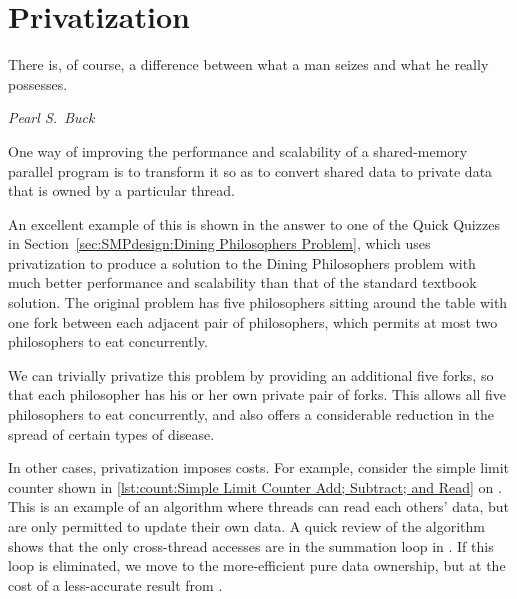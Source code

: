\section{Privatization}
\label{sec:owned:Privatization}
%
\epigraph{There is, of course, a difference between what a man seizes
	  and what he really possesses.}
	 {\emph{Pearl S.~Buck}}

One way of improving the performance and scalability of a shared-memory
parallel program is to transform it so as to convert shared data to
private data that is owned by a particular thread.

An excellent example of this is shown in the answer to one of the
Quick Quizzes in
Section~\ref{sec:SMPdesign:Dining Philosophers Problem},
which uses privatization to produce a solution to the
Dining Philosophers problem with much better performance and scalability
than that of the standard textbook solution.
The original problem has five philosophers sitting around the table
with one fork between each adjacent pair of philosophers, which permits
at most two philosophers to eat concurrently.

We can trivially privatize this problem by providing an additional five
forks, so that each philosopher has his or her own private pair of forks.
This allows all five philosophers to eat concurrently, and also offers
a considerable reduction in the spread of certain types of disease.

In other cases, privatization imposes costs.
For example, consider the simple limit counter shown in
\cref{lst:count:Simple Limit Counter Add; Subtract; and Read} on
.
This is an example of an algorithm where threads can read each others'
data, but are only permitted to update their own data.
A quick review of the algorithm shows that the only cross-thread
accesses are in the summation loop in .
If this loop is eliminated, we move to the more-efficient pure
data ownership, but at the cost of a less-accurate result
from .

\QuickQuizEnd

